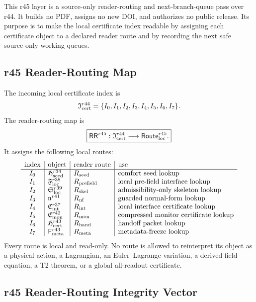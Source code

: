 This r45 layer is a source-only reader-routing and next-branch-queue pass over
r44.  It builds no PDF, assigns no new DOI, and authorizes no public release.
Its purpose is to make the local certificate index readable by assigning each
certificate object to a declared reader route and by recording the next safe
source-only working queues.

\subsection{r45 Reader-Routing Map}
\label{subsec:r45-reader-routing-map}

The incoming local certificate index is
\[
\mathfrak I_{\rm cert}^{r44}
=
\{I_0,I_1,I_2,I_3,I_4,I_5,I_6,I_7\}.
\]
The reader-routing map is
\[
\boxed{
\mathsf{RR}^{r45}:
\mathfrak I_{\rm cert}^{r44}
\longrightarrow
\mathsf{Route}_{\rm loc}^{r45}.
}
\]
It assigns the following local routes:
\[
\begin{array}{c|l|l|l}
\text{index} & \text{object} & \text{reader route} & \text{use}\\
\hline
I_0 & \mathfrak H_{\rm seed}^{r34} & R_{\rm seed} & \text{comfort seed lookup}\\
I_1 & \mathfrak F_{\rm loc}^{r38} & R_{\rm prefield} & \text{local pre-field interface lookup}\\
I_2 & \mathfrak S_{\rm loc}^{r39} & R_{\rm skel} & \text{admissibility-only skeleton lookup}\\
I_3 & \mathfrak n^{r41} & R_{\rm nf} & \text{guarded normal-form lookup}\\
I_4 & \mathfrak C_{\rm int}^{r37} & R_{\rm int} & \text{local interface certificate lookup}\\
I_5 & \mathfrak C_{\rm mon}^{r42} & R_{\rm mon} & \text{compressed monitor certificate lookup}\\
I_6 & \mathfrak H_{\rm cert}^{r43} & R_{\rm hand} & \text{handoff packet lookup}\\
I_7 & \mathsf F_{\rm meta}^{r43} & R_{\rm meta} & \text{metadata-freeze lookup}
\end{array}
\]
Every route is local and read-only.  No route is allowed to reinterpret its
object as a physical action, a Lagrangian, an Euler--Lagrange variation, a
derived field equation, a T2 theorem, or a global all-readout certificate.

\subsection{r45 Reader-Routing Integrity Vector}
\label{subsec:r45-reader-routing-integrity-vector}

